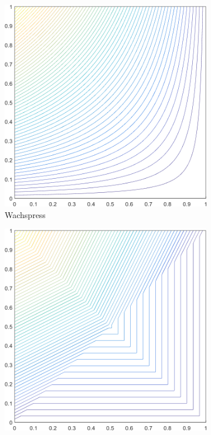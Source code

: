 \begin{figure}
\centering
{
	\begin{subfigure}[b]{0.39\textwidth}
		\centering
		\includegraphics[width=\textwidth]{figures/sec_BF/square_WACHSPRESS1_contour_b4.png}
		\caption{Wachspress}
	\end{subfigure}
	\hspace{1.5cm}
	\begin{subfigure}[b]{0.39\textwidth}
		\centering
		\includegraphics[width=\textwidth]{figures/sec_BF/square_PWLD1_contour_b4.png}

\end{subfigure}}
\end{figure}

